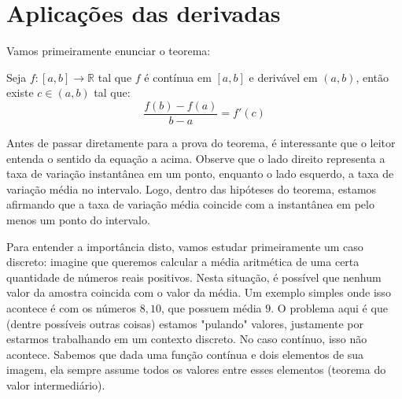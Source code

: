 
\chapter{Aplicações das derivadas}\label{cap:apl_derivadas}

\emconstrucao
	Vamos primeiramente enunciar o teorema:
	\begin{teo}
		Seja $f:[a,b]\to \mathbb{R}$ tal que $f$ é contínua em $[a,b]$ e derivável em $(a,b)$, então existe $c \in (a,b)$ tal que:
		$$\frac{f(b) - f(a)}{b - a} = f'(c)$$
	\end{teo}
	Antes de passar diretamente para a prova do teorema, é interessante que o leitor entenda o sentido da equação a acima. Observe que o lado direito representa a taxa de variação instantânea em um ponto, enquanto o lado esquerdo, a taxa de variação média no intervalo. Logo, dentro das hipóteses do teorema, estamos afirmando que a taxa de variação média coincide com a instantânea em pelo menos um ponto do intervalo. 
	
	Para entender a importância disto, vamos estudar primeiramente um caso discreto: imagine que queremos calcular a média aritmética de uma certa quantidade de números reais positivos. Nesta situação, é possível que nenhum valor da amostra coincida com o valor da média. Um exemplo simples onde isso acontece é com os números $8,10$, que possuem média $9$. O problema aqui é que (dentre possíveis outras coisas) estamos "pulando" valores, justamente por estarmos trabalhando em um contexto discreto. No caso contínuo, isso não acontece. Sabemos que dada uma função contínua e dois elementos de sua imagem, ela sempre assume todos os valores entre esses elementos (teorema do valor intermediário).
	

